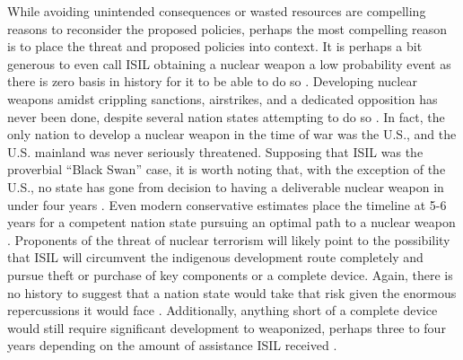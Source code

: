 \documentclass{report}
\begin{document}
While avoiding unintended consequences or wasted resources are compelling reasons to reconsider the proposed policies, perhaps the most compelling reason is to place the threat and proposed policies into context.  It is perhaps a bit generous to even call ISIL obtaining a nuclear weapon a low probability event as there is zero basis in history for it to be able to do so \cite{pollack2014unthinkable,Bracken2013,Reed2010,Agency2004}. Developing nuclear weapons amidst crippling sanctions, airstrikes, and a dedicated opposition has never been done, despite several nation states attempting to do so \cite{Reed2010,Agency2004}.  In fact, the only nation to develop a nuclear weapon in the time of war was the U.S., and the U.S. mainland was never seriously threatened. Supposing that ISIL was the proverbial \enquote{Black Swan} case, it is worth noting that, with the exception of the U.S., no state has gone from decision to having a deliverable nuclear weapon in under four years \cite{Reed2010}. Even modern conservative estimates place the timeline at 5-6 years for a competent nation state pursuing an optimal path to a nuclear weapon \cite{Harney2006}. Proponents of the threat of nuclear terrorism will likely point to the possibility that ISIL will circumvent the indigenous development route completely and pursue theft or purchase of key components or a complete device.  Again, there is no history to suggest that a nation state would take that risk given the enormous repercussions it would face \cite{pollack2014unthinkable}.  Additionally, anything short of a complete device would still require significant development to weaponized, perhaps three to four years depending on the amount of assistance ISIL received \cite{Harney2006}.  
\end{document}
